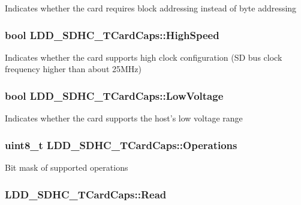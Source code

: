 Indicates whether the card requires block addressing instead of byte addressing \hypertarget{struct_l_d_d___s_d_h_c___t_card_caps_a382fb9e854ee58ba00f5e390345dad9c}{
\subsubsection[{High\-Speed}]{\setlength{\rightskip}{0pt plus 5cm}bool L\-D\-D\-\_\-\-S\-D\-H\-C\-\_\-\-T\-Card\-Caps\-::\-High\-Speed}}\label{struct_l_d_d___s_d_h_c___t_card_caps_a382fb9e854ee58ba00f5e390345dad9c}
Indicates whether the card supports high clock configuration (S\-D bus clock frequency higher than about 25\-M\-Hz) \hypertarget{struct_l_d_d___s_d_h_c___t_card_caps_a283a376bda2540641d83cde61d1e0188}{
\subsubsection[{Low\-Voltage}]{\setlength{\rightskip}{0pt plus 5cm}bool L\-D\-D\-\_\-\-S\-D\-H\-C\-\_\-\-T\-Card\-Caps\-::\-Low\-Voltage}}\label{struct_l_d_d___s_d_h_c___t_card_caps_a283a376bda2540641d83cde61d1e0188}
Indicates whether the card supports the host's low voltage range \hypertarget{struct_l_d_d___s_d_h_c___t_card_caps_a4af30c5df5445720a0da2f6abdcc9629}{
\subsubsection[{Operations}]{\setlength{\rightskip}{0pt plus 5cm}uint8\-\_\-t L\-D\-D\-\_\-\-S\-D\-H\-C\-\_\-\-T\-Card\-Caps\-::\-Operations}}\label{struct_l_d_d___s_d_h_c___t_card_caps_a4af30c5df5445720a0da2f6abdcc9629}
Bit mask of supported operations \hypertarget{struct_l_d_d___s_d_h_c___t_card_caps_ae5a39842e7b8c28f9246d3fc1b9a8f54}{
\subsubsection[{Read}]{ L\-D\-D\-\_\-\-S\-D\-H\-C\-\_\-\-T\-Card\-Caps\-::\-Read}}\label{struct_l_d_d___s_d_h_c___t_card_caps_ae5a39842e7b8c28f9246d3fc1b9a8f54}
